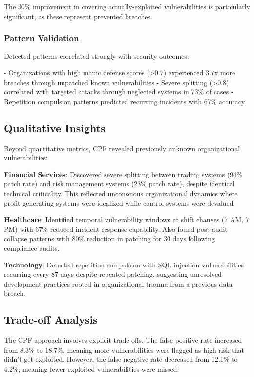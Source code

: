 \documentclass[11pt,a4paper]{article}
\begin{document}
The 30\% improvement in covering actually-exploited vulnerabilities is particularly significant, as these represent prevented breaches.

\subsubsection{Pattern Validation}

Detected patterns correlated strongly with security outcomes:

- Organizations with high manic defense scores (>0.7) experienced 3.7x more breaches through unpatched known vulnerabilities
- Severe splitting (>0.8) correlated with targeted attacks through neglected systems in 73\% of cases
- Repetition compulsion patterns predicted recurring incidents with 67\% accuracy

\subsection{Qualitative Insights}

Beyond quantitative metrics, CPF revealed previously unknown organizational vulnerabilities:

\textbf{Financial Services}: Discovered severe splitting between trading systems (94\% patch rate) and risk management systems (23\% patch rate), despite identical technical criticality. This reflected unconscious organizational dynamics where profit-generating systems were idealized while control systems were devalued.

\textbf{Healthcare}: Identified temporal vulnerability windows at shift changes (7 AM, 7 PM) with 67\% reduced incident response capability. Also found post-audit collapse patterns with 80\% reduction in patching for 30 days following compliance audits.

\textbf{Technology}: Detected repetition compulsion with SQL injection vulnerabilities recurring every 87 days despite repeated patching, suggesting unresolved development practices rooted in organizational trauma from a previous data breach.

\subsection{Trade-off Analysis}

The CPF approach involves explicit trade-offs. The false positive rate increased from 8.3\% to 18.7\%, meaning more vulnerabilities were flagged as high-risk that didn't get exploited. However, the false negative rate decreased from 12.1\% to 4.2\%, meaning fewer exploited vulnerabilities were missed.
\end{document}
